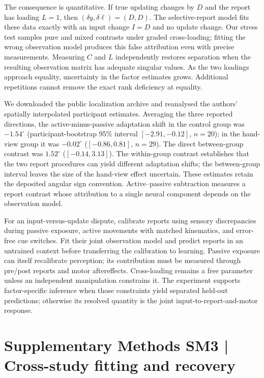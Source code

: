 \documentclass[11pt,a4paper]{article}
\begin{document}
The consequence is quantitative. If true updating changes by $D$ and the report has loading $L=1$, then $(\delta y,\delta\ell)=(D,D)$. The selective-report model fits these data exactly with an input change $I=D$ and no update change. Our stress test samples pure and mixed contrasts under graded cross-loading; fitting the wrong observation model produces this false attribution even with precise measurements. Measuring $C$ and $L$ independently restores separation when the resulting observation matrix has adequate singular values. As the two loadings approach equality, uncertainty in the factor estimates grows. Additional repetitions cannot remove the exact rank deficiency at equality.

We downloaded the public localization archive and reanalysed the authors' spatially interpolated participant estimates. Averaging the three reported directions, the active-minus-passive adaptation shift in the control group was $-1.54^\circ$ (participant-bootstrap 95\% interval $[-2.91,-0.12]$, $n=20$); in the hand-view group it was $-0.02^\circ$ ($[-0.86,0.81]$, $n=29$). The direct between-group contrast was $1.52^\circ$ ($[-0.14,3.13]$). The within-group contrast establishes that the two report procedures can yield different adaptation shifts; the between-group interval leaves the size of the hand-view effect uncertain. These estimates retain the deposited angular sign convention. Active--passive subtraction measures a report contrast whose attribution to a single neural component depends on the observation model. \cite{external2020}

For an input-versus-update dispute, calibrate reports using sensory discrepancies during passive exposure, active movements with matched kinematics, and error-free cue switches. Fit their joint observation model and predict reports in an untrained context before transferring the calibration to learning. Passive exposure can itself recalibrate perception; its contribution must be measured through pre/post reports and motor aftereffects. Cross-loading remains a free parameter unless an independent manipulation constrains it. The experiment supports factor-specific inference when those constraints yield separated held-out predictions; otherwise its resolved quantity is the joint input-to-report-and-motor response.

\clearpage\section{Supplementary Methods SM3 | Cross-study fitting and recovery}
\end{document}
